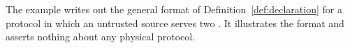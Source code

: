 
The example writes out the general format of
Definition~\ref{def:declaration} for a protocol in which an untrusted source
serves two . It illustrates the format and asserts nothing
about any physical protocol.

